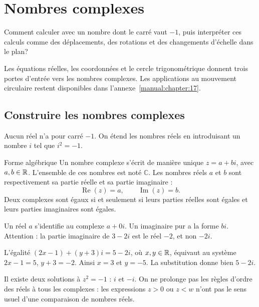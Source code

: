 \chapter{Nombres complexes}
\label{manual:chapter:complexes}

\begin{questionbox}
Comment calculer avec un nombre dont le carré vaut $-1$, puis interpréter ces calculs comme des déplacements, des rotations et des changements d'échelle dans le plan?
\end{questionbox}

Les équations réelles, les coordonnées et le cercle trigonométrique donnent trois portes d'entrée vers les nombres complexes. Les applications au mouvement circulaire restent disponibles dans l'annexe~\ref{manual:chapter:17}.

\section{Construire les nombres complexes}
\label{manual:section:complexes.01}

Aucun réel n'a pour carré $-1$. On étend les nombres réels en introduisant un nombre $i$ tel que $i^2=-1$.

\begin{definition}{Forme algébrique}{}
Un nombre complexe s'écrit de manière unique $z=a+bi$, avec $a,b\in\mathbb{R}$. L'ensemble de ces nombres est noté $\mathbb C$. Les nombres réels $a$ et $b$ sont respectivement sa partie réelle et sa partie imaginaire :
\[
\operatorname{Re}(z)=a,\qquad \operatorname{Im}(z)=b.
\]
Deux complexes sont égaux si et seulement si leurs parties réelles sont égales et leurs parties imaginaires sont égales.
\end{definition}

Un réel $a$ s'identifie au complexe $a+0i$. Un imaginaire pur a la forme $bi$. Attention : la partie imaginaire de $3-2i$ est le réel $-2$, et non $-2i$.

\begin{examplebox}
L'égalité $(2x-1)+(y+3)i=5-2i$, où $x,y\in\mathbb{R}$, équivaut au système $2x-1=5$, $y+3=-2$. Ainsi $x=3$ et $y=-5$. La substitution donne bien $5-2i$.
\end{examplebox}

Il existe deux solutions à $z^2=-1$ : $i$ et $-i$. On ne prolonge pas les règles d'ordre des réels à tous les complexes : les expressions $z>0$ ou $z<w$ n'ont pas le sens usuel d'une comparaison de nombres réels.

